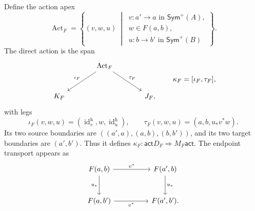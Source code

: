 \documentclass[oneside]{article}
\newcommand{\Sym}{\mathsf{Sym}}
\newcommand{\id}{\operatorname{id}}
\newcommand{\act}{\mathsf{act}}
\theoremstyle{plain}
\theoremstyle{definition}
\theoremstyle{remark}
\begin{document}
Define the action apex
\begin{equation}
 \operatorname{Act}_F=
 \left\{(v,w,u)\ \middle|\
 \begin{array}{l}
 v:a'\to a\text{ in }\Sym^+(A),\\
 w\in F(a,b),\\
 u:b\to b'\text{ in }\Sym^+(B)
 \end{array}\right\}.
 \label{eq:cgqg-distributor-action-witness-apex}
\end{equation}
The direct action is the span
\begin{equation}
 \begin{tikzcd}[column sep=large,row sep=large]
 &\operatorname{Act}_F
   \arrow[dl,"\iota_F"']\arrow[dr,"\tau_F"]&\\
 K_F&&J_F,
 \end{tikzcd}
 \qquad \kappa_F=[\iota_F,\tau_F],
 \label{eq:cgqg-distributor-action-span}
\end{equation}
with legs
\begin{equation}
 \iota_F(v,w,u)=(\id_v^{\mathrm h},w,\id_u^{\mathrm h}),\qquad
 \tau_F(v,w,u)=(a,b,u_*v^*w).
 \label{eq:cgqg-distributor-action-legs}
\end{equation}
Its two source boundaries are \(((a',a),(a,b),(b,b'))\), and its two
target boundaries are \((a',b')\). Thus it defines
\(\kappa_F:\act D_F\Rightarrow M_F\act\). The endpoint transport appears as
\[
 \begin{tikzcd}[column sep=huge,row sep=large]
 F(a,b)\arrow[r,"v^*"]\arrow[d,"u_*"']
   &F(a',b)\arrow[d,"u_*"]\\
 F(a,b')\arrow[r,"v^*"']&F(a',b').
 \end{tikzcd}
\]
\end{document}
